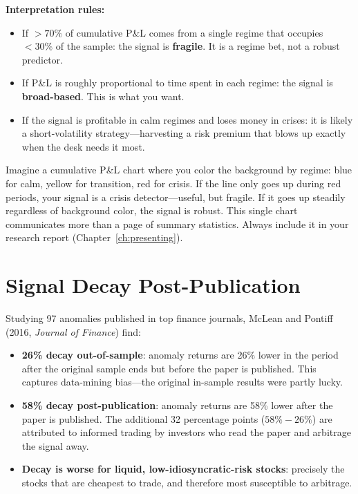 \textbf{Interpretation rules:}
\begin{itemize}[nosep]
  \item If $>70\%$ of cumulative P\&L comes from a single regime that occupies $<30\%$ of the sample: the signal is \textbf{fragile}.  It is a regime bet, not a robust predictor.
  \item If P\&L is roughly proportional to time spent in each regime: the signal is \textbf{broad-based}.  This is what you want.
  \item If the signal is profitable in calm regimes and loses money in crises: it is likely a short-volatility strategy---harvesting a risk premium that blows up exactly when the desk needs it most.
\end{itemize}

\begin{intuition}
Imagine a cumulative P\&L chart where you color the background by regime: blue for calm, yellow for transition, red for crisis.  If the line only goes up during red periods, your signal is a crisis detector---useful, but fragile.  If it goes up steadily regardless of background color, the signal is robust.  This single chart communicates more than a page of summary statistics.  Always include it in your research report (Chapter~\ref{ch:presenting}).
\end{intuition}


\section{Signal Decay Post-Publication}
\label{sec:signal-decay}

\begin{keyresult}
Studying 97 anomalies published in top finance journals, McLean and Pontiff (2016, \emph{Journal of Finance}) find:
\begin{itemize}[nosep]
  \item \textbf{26\% decay out-of-sample}: anomaly returns are 26\% lower in the period after the original sample ends but before the paper is published.  This captures data-mining bias---the original in-sample results were partly lucky.
  \item \textbf{58\% decay post-publication}: anomaly returns are 58\% lower after the paper is published.  The additional 32 percentage points ($58\% - 26\%$) are attributed to informed trading by investors who read the paper and arbitrage the signal away.
  \item \textbf{Decay is worse for liquid, low-idiosyncratic-risk stocks}: precisely the stocks that are cheapest to trade, and therefore most susceptible to arbitrage.
\end{itemize}
\end{keyresult}

